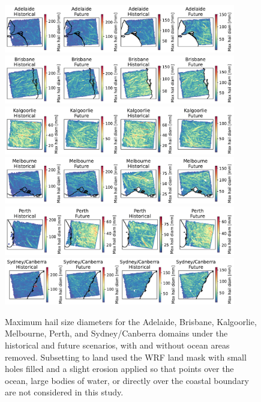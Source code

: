 \documentclass[draft,grl]{agutexSI2019}\usepackage[]{graphicx}\usepackage[]{xcolor}
\begin{document}
\begin{article}
\begin{figure}[!ht]
    \centering
    \includegraphics[width=0.9\textwidth]{figures/maxes_Adelaide_hailcast_diam_max}
    \includegraphics[width=0.9\textwidth]{figures/maxes_Brisbane_hailcast_diam_max}
    \includegraphics[width=0.9\textwidth]{figures/maxes_Kalgoorlie_hailcast_diam_max}
    \includegraphics[width=0.9\textwidth]{figures/maxes_Melbourne_hailcast_diam_max}
    \includegraphics[width=0.9\textwidth]{figures/maxes_Perth_hailcast_diam_max}
    \includegraphics[width=0.9\textwidth]{figures/maxes_Sydney_Canberra_hailcast_diam_max}
    \caption{Maximum hail size diameters for the Adelaide, Brisbane, Kalgoorlie,
    Melbourne, Perth, and Sydney/Canberra domains under the historical and
    future scenarios, with and without ocean areas removed. Subsetting to land
    used the WRF land mask with small holes filled and a slight erosion applied
    so that points over the ocean, large bodies of water, or directly over the
    coastal boundary are not considered in this study.}
    \label{fig:maxes_with_removed_pts}
\end{figure}


\end{article}
\end{document}
